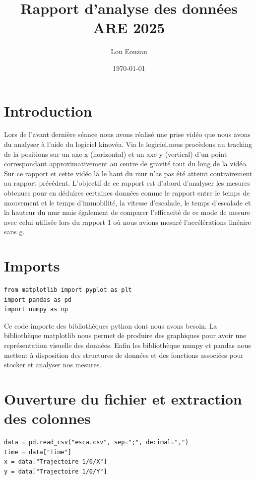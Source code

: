 \documentclass[11pt]{article}
\author{Lou Eouzan}
\date{\today}
\title{Rapport d'analyse des données ARE 2025}
\begin{document}
\maketitle
\tableofcontents

\section{Introduction}
\label{sec:org2fa46a3}

Lors de l'avant dernière séance nous avons réalisé une prise vidéo que nous avons du analyser à l'aide du logiciel kinovéa. Via le logiciel,nous
procèdons au tracking de la positions sur un axe x (horizontal) et un axe y (vertical) d'un point correspondant approximativement au centre de gravité
tout du long de la vidéo. Sur ce rapport et cette vidéo là le haut du mur n'as pas été atteint contrairement au rapport précédent. L'objectif de ce
rapport est d'abord d'analyser les mesures obtenues pour en déduires certaines données comme le rapport entre le temps de mouvement et le temps
d’immobilité, la vitesse d'escalade, le temps d'escalade et la hauteur du mur mais également de comparer l'efficacité de ce mode de mesure avec celui
utilisée lors du rapport 1 où nous avions mesuré l'accélérations linéaire sans g.
\section{Imports}
\label{sec:orge9ee1b5}

\begin{verbatim}
from matplotlib import pyplot as plt
import pandas as pd
import numpy as np
\end{verbatim}

Ce code importe des bibliothèques python dont nous avons besoin. La bibliothèque matplotlib nous permet de produire des graphiques pour avoir une
représentation visuelle des données. Enfin les bibliothèque numpy et pandas nous mettent à disposition des structures de données et des fonctions
associées pour stocker et analyser nos mesures.
\section{Ouverture du fichier et extraction des colonnes}
\label{sec:org8fe3589}

\begin{verbatim}
data = pd.read_csv("esca.csv", sep=";", decimal=",") 
time = data["Time"]
x = data["Trajectoire 1/0/X"]
y = data["Trajectoire 1/0/Y"]
\end{verbatim}
\end{document}
